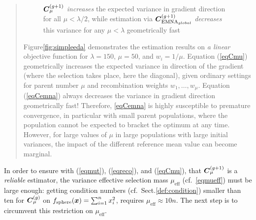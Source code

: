 \documentclass{article} %
\newenvironment{einschub}{%
\begin{small} \begin{quotation}\noindent}{%
  \vspace{0.5ex}\end{quotation}\end{small}%
}
\newcommand{\kom}[1]{}
\newcommand{\ve}[1]{\mathchoice{\mbox{\boldmath$\displaystyle#1$}}
  {\mbox{\boldmath$\textstyle#1$}} {\mbox{\boldmath$\scriptstyle#1$}}
  {\mbox{\boldmath$\scriptscriptstyle#1$}}}
\newcommand{\ma}[1]{\mathchoice{\mbox{\boldmath$\displaystyle#1$}}
  {\mbox{\boldmath$\textstyle#1$}} {\mbox{\boldmath$\scriptstyle#1$}}
  {\mbox{\boldmath$\scriptscriptstyle#1$}}}
\newcommand{\fsphere}{f_{\mathrm{sphere}}}
\newcommand{\N}{\ensuremath{n}}
\newcommand{\mueff}{\ensuremath{\mu_\mathrm{eff}}}
\newcommand{\summ}[2]{\sum_{#1=1}^{#2}}
\newcommand{\lam}{\ensuremath{\lambda}}
\newcommand{\Cg}{\ensuremath{\ma{C}^{(g)}}}
\newcommand{\Cgg}{\ma{C}^{(g+1)}}
\newcommand{\nref}[1]{\nolinebreak[4]\hspace{0.2845em plus0.05em minus0.17em}\nolinebreak[4]\ref{#1}}
\newcommand{\pref}[1]{\mbox{.\hspace{0.235em}\ref{#1}}}
\newcommand{\eqrefadd}[1]{(\ref{#1})} %
\newcommand{\eqsref}[1]{(\ref{#1})}
\newcommand{\Eqref}[1]{Equation (\ref{#1})}
\begin{document}
{\begin{einschub}
\begin{figure}[t]
{  $\Cgg_\mu$ \emph{increases} the expected variance in gradient
  direction for all $\mu<\lam/2$, while estimation via
  $\Cgg_{\mathrm{EMNA}_{global}}$ \emph{decreases} this variance for
  any $\mu<\lam$ geometrically fast}
\end{figure}
%
 Figure\nref{fig:simpleeda} demonstrates the estimation results on
 \emph{a linear} objective function for $\lam=150$, $\mu=50$, and
 $w_i=1/\mu$.  \Eqref{eqCmu} geometrically increases the expected
 variance in direction of the gradient (where the selection takes
 place, here the diagonal), given ordinary settings for parent number
 $\mu$ and recombination weights $w_1,\dots,w_\mu$. \Eqref{eqCemna}
 always decreases the variance in gradient direction geometrically
 fast!  Therefore, \eqref{eqCemna} is highly susceptible\kom{prone} to
 premature convergence, in particular with small parent populations,
 where the population cannot be expected to bracket the optimum at any
 time.  However, for large values of $\mu$ in large populations with
 large initial variances, the impact of the different reference mean
 value can become marginal.
\end{einschub}}

%
 In order to ensure with \eqsref{eqmut}, \eqrefadd{eqreco}, and
 \eqrefadd{eqCmu}, that $\Cgg_\mu$ is a \emph{reliable} estimator, the
 variance effective selection mass $\mueff$ (cf.\ \eqref{eqmueff})
 must be large enough: getting condition numbers (cf.\
 Sect\pref{def:condition}) smaller than ten for $\Cg_\mu$ on
 $\fsphere(\ve{x})=\summ{i}{\N}x_i^2$, requires $\mueff\approx10\N$.
\kom{AR smaller 3 for re-estimation $3\N$ is sufficient}The next step
is to circumvent this restriction on $\mueff$.

\end{document}
